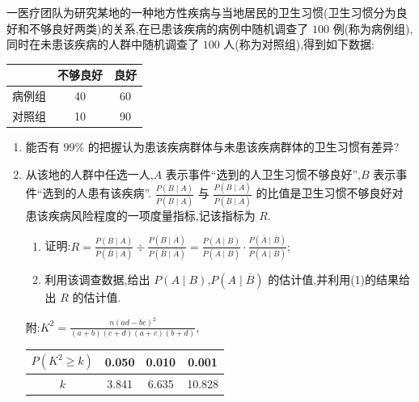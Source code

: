 \begin{problem}
一医疗团队为研究某地的一种地方性疾病与当地居民的卫生习惯(卫生习惯分为良好和不够良好两类)的关系,在已患该疾病的病例中随机调查了 \(100\) 例(称为病例组),同时在未患该疾病的人群中随机调查了 \(100\) 人(称为对照组),得到如下数据:

\begin{center}
\begin{tabular}{|c|c|c|}
\hline
 & 不够良好 & 良好 \\
\hline
病例组 & 40 & 60 \\
\hline
对照组 & 10 & 90 \\
\hline
\end{tabular}
\end{center}

\begin{enumerate}
\item 能否有 \(99\%\) 的把握认为患该疾病群体与未患该疾病群体的卫生习惯有差异?

\item 从该地的人群中任选一人,\(A\) 表示事件``选到的人卫生习惯不够良好'',\(B\) 表示事件``选到的人患有该疾病''. \(\frac{P(B\mid A)}{P(\overline B\mid A)}\) 与 \(\frac{P(B\mid \overline A)}{P(\overline B\mid \overline A)}\) 的比值是卫生习惯不够良好对患该疾病风险程度的一项度量指标,记该指标为 \(R\).

\begin{enumerate}
\item 证明:\(R=\frac{P(B\mid A)}{P(\overline B\mid A)}\div \frac{P(B\mid \overline A)}{P(\overline B\mid \overline A)}=\frac{P(A\mid B)}{P(\overline A\mid B)}\cdot \frac{P(\overline A\mid \overline B)}{P(A\mid \overline B)};\)

\item 利用该调查数据,给出 \(P(A\mid B)\),\(P(A\mid \overline B)\) 的估计值,并利用(1)的结果给出 \(R\) 的估计值.
\end{enumerate}

附:\(K^2=\frac{n(ad-bc)^2}{(a+b)(c+d)(a+c)(b+d)}\),

\begin{center}
\begin{tabular}{|c|c|c|c|}
\hline
\(P(K^2\ge k)\) & 0.050 & 0.010 & 0.001 \\
\hline
\(k\) & 3.841 & 6.635 & 10.828 \\
\hline
\end{tabular}
\end{center}
\end{enumerate}
\end{problem}

